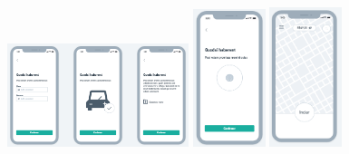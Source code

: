 \begin{center}
\\
\includegraphics[width=200]{exemplos/Wireframe/Wireframe12.PNG}
\includegraphics[width=80]{exemplos/Wireframe/Wireframe13.PNG}
\includegraphics[width=80]{exemplos/Wireframe/Wireframe14.PNG}

\end{center}

